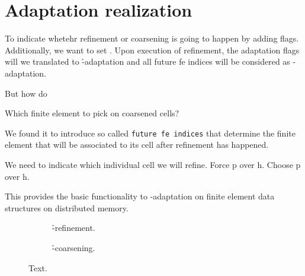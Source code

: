 \section{Adaptation realization}
\label{sec:adaptation}


To indicate whetehr refinement or coarsening is going to happen by adding flags. Additionally, we want to set . Upon execution of refinement, the adaptation flags will we translated to \h-adaptation and all future fe indices will be considered as \p-adaptation.

But how do

Which finite element to pick on coarsened cells?

We found it to introduce so called \texttt{future fe indices} that determine the finite element that will be associated to its cell after refinement has happened.

We need to indicate which individual cell we will refine. Force p over h. Choose p over h.

This provides the basic functionality to \hp-adaptation on finite element data structures on distributed memory.


\begin{figure}
\begin{subfigure}{.5\textwidth}
  \caption{\h-refinement.}
\end{subfigure}
\begin{subfigure}{.5\textwidth}
  \caption{\h-coarsening.}
\end{subfigure}
\caption{Text.}
\label{fig:adaptation.}
\end{figure}